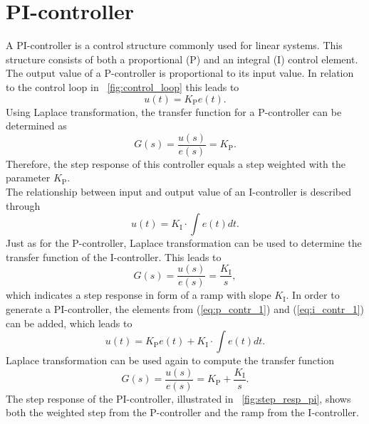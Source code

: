 \section{PI-controller}
A PI-controller is a control structure commonly used for linear systems. This structure consists of both a proportional (P) and an integral (I) control element.
The output value of a P-controller is proportional to its input value. In relation to the control loop in \figurename~\ref{fig:control_loop} this leads to
\begin{equation}
    u(t) = K_{\mathrm{P}}e(t).
 \label{eq:p_contr_1}
\end{equation}
\newpage
Using Laplace transformation, the transfer function for a P-controller can be determined as
\begin{equation}
    G(s) = \frac{u(s)}{e(s)} = K_{\mathrm{P}}.
 \label{eq:p_contr_2}
\end{equation}
Therefore, the step response of this controller equals a step weighted with the parameter $K_{\mathrm{P}}$.
\\The relationship between input and output value of an I-controller is described through
\begin{equation}
    u(t) = K_{\mathrm{I}}\cdot\int e(t) dt.
 \label{eq:i_contr_1}
\end{equation}
Just as for the P-controller, Laplace transformation can be used to determine the transfer function of the I-controller.
This leads to
\begin{equation}
    G(s) = \frac{u(s)}{e(s)} = \frac{K_{\mathrm{I}}}{s},
 \label{eq:i_contr_2}
\end{equation}
which indicates a step response in form of a ramp with slope $K_{\mathrm{I}}$.
In order to generate a PI-controller, the elements from (\ref{eq:p_contr_1}) and (\ref{eq:i_contr_1}) can be added, which leads to
\begin{equation}
    u(t) = K_{\mathrm{P}}e(t) + K_{\mathrm{I}}\cdot\int e(t) dt.
 \label{eq:pi_contr_1}
\end{equation}
Laplace transformation can be used again to compute the transfer function
\begin{equation}
    G(s) = \frac{u(s)}{e(s)} =  K_{\mathrm{P}} + \frac{K_{\mathrm{I}}}{s}.
 \label{eq:pi_contr_2}
\end{equation}
The step response of the PI-controller, illustrated in \figurename~\ref{fig:step_resp_pi}, shows both the weighted step from the P-controller and the ramp from the I-controller.

